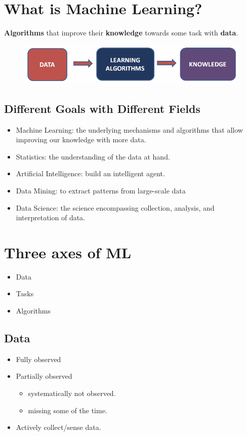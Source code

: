 \documentclass[letterpaper,10pt]{article}
\begin{document}
\section{What is Machine Learning?}

\textbf{Algorithms} that improve their \textbf{knowledge} towards some task with \textbf{data}.
\begin{figure}[!h]
	\centering
	\includegraphics[width=15cm]{./img/machinelearning.png}
\end{figure}

\subsection{Different Goals with Different Fields}

\begin{itemize}
	\item Machine Learning: the underlying mechanisms and algorithms that allow improving our knowledge with more data.
	\item Statistics: the understanding of the data at hand.
	\item Artificial Intelligence: build an intelligent agent.
	\item Data Mining: to extract patterns from large-scale data
	\item Data Science: the science encompassing collection, analysis, and interpretation of data.
\end{itemize}

\section{Three axes of ML}

\begin{itemize}
	\item Data
	\item Tasks
	\item Algorithms
\end{itemize}

\subsection{Data}

\begin{itemize}
	\item Fully observed
	\item Partially observed
	\begin{itemize}
		\item systematically not observed.
		\item missing some of the time.
	\end{itemize}
	\item Actively collect/sense data.
\end{itemize}
\end{document}

